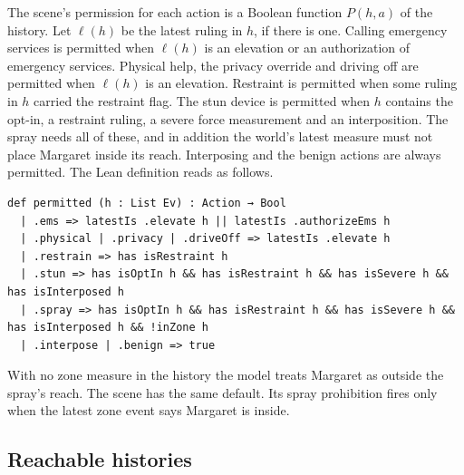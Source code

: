 The scene's permission for each action is a Boolean function $P(h, a)$ of the history.
Let $\ell(h)$ be the latest ruling in $h$, if there is one.
Calling emergency services is permitted when $\ell(h)$ is an elevation or an authorization of
emergency services.
Physical help, the privacy override and driving off are permitted when $\ell(h)$ is an
elevation.
Restraint is permitted when some ruling in $h$ carried the restraint flag.
The stun device is permitted when $h$ contains the opt-in, a restraint ruling, a severe force
measurement and an interposition.
The spray needs all of these, and in addition the world's latest measure must not place Margaret
inside its reach.
Interposing and the benign actions are always permitted.
The Lean definition reads as follows.
\begin{lstlisting}[style=lean]
def permitted (h : List Ev) : Action → Bool
  | .ems => latestIs .elevate h || latestIs .authorizeEms h
  | .physical | .privacy | .driveOff => latestIs .elevate h
  | .restrain => has isRestraint h
  | .stun => has isOptIn h && has isRestraint h && has isSevere h && has isInterposed h
  | .spray => has isOptIn h && has isRestraint h && has isSevere h && has isInterposed h && !inZone h
  | .interpose | .benign => true
\end{lstlisting}
With no zone measure in the history the model treats Margaret as outside the spray's reach.
The scene has the same default.
Its spray prohibition  fires only when the latest zone event says Margaret is
inside.

\subsection{Reachable histories}

